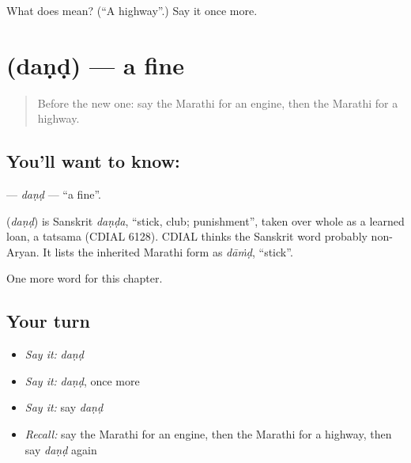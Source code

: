 \begin{tcolorbox}[breakable,colback=teal!4,colframe=teal!35!black,title={Before you move on}]
What does  mean? (\textquotedblleft{}A highway\textquotedblright{}.) Say it once more.
\end{tcolorbox}
\section[\texorpdfstring{\mr{दंड} (daṇḍ)}{दंड (daṇḍ)}]{ (daṇḍ) — a fine}

\label{lesson:MR-C266-dand}



\begin{quote}
Before the new one: say the Marathi for an engine, then the Marathi for a highway.
\end{quote}

\subsection*{You'll want to know: }
\textbf{} — \emph{daṇḍ} — \textquotedblleft{}a fine\textquotedblright{}.

\begin{cousinweb}
\textbf{} (\emph{daṇḍ}) is Sanskrit \emph{daṇḍa}, \textquotedblleft{}stick, club; punishment\textquotedblright{}, taken over whole as a learned loan, a tatsama (CDIAL 6128). CDIAL thinks the Sanskrit word probably non-Aryan. It lists the inherited Marathi form as \emph{dāṁḍ}, \textquotedblleft{}stick\textquotedblright{}.
\end{cousinweb}

\begin{grammarlens}[title={What you've built}]
One more word for this chapter.
\end{grammarlens}

\subsection*{Your turn}
\begin{itemize}
\raggedright
  \item \emph{Say it:} \emph{daṇḍ}
  \item \emph{Say it:} \emph{daṇḍ}, once more
  \item \emph{Say it:} say \emph{daṇḍ}
  \item \emph{Recall:} say the Marathi for an engine, then the Marathi for a highway, then say \emph{daṇḍ} again
\end{itemize}

